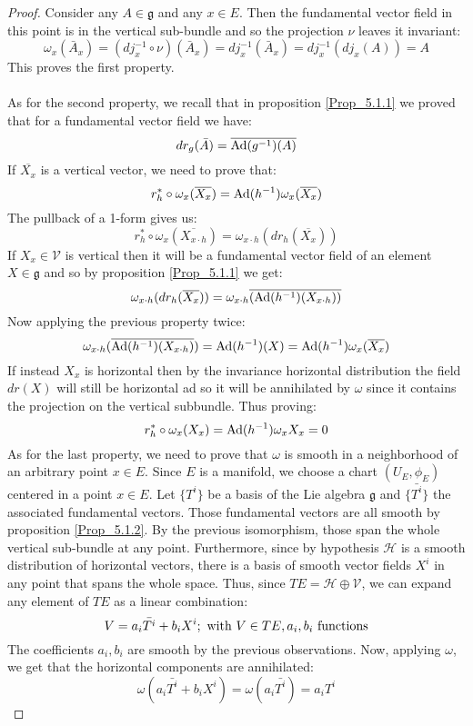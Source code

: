 \documentclass[12pt,a4paper]{report}
\theoremstyle{definition}
\theoremstyle{Theorem}
\theoremstyle{definition}
\theoremstyle{definition}
\begin{document}
	\begin{proof}
		Consider any $A\in\mathfrak{g}$ and any $x\in E$. Then the fundamental vector field in this point is in the vertical sub-bundle and so the projection $\nu$ leaves it invariant:
		$$\omega_{x}(\bar{A}_{x})=(dj_{x}^{-1}\circ \nu)(\bar{A}_{x})=dj_{x}^{-1}(\bar{A}_{x})=
		dj_{x}^{-1}(dj_{x}(A))=A$$
		This proves the first property.\\
		\\
		As for the second property, we recall that in proposition \ref{Prop_5.1.1} we proved that for a fundamental vector field  we have:
		$$dr_g(\bar{A})=\overline{\hbox{Ad}(g^{-1})(A)}$$
		If $\overline{X_x}$ is a vertical vector, we need to prove that:
		$$r^*_h\circ \omega_{x}(\overline{X_{x}})=\hbox{Ad}(h^{-1})\omega_{x}(\overline{X_{x}})$$
		The pullback of a 1-form gives us:
		$$r^*_h\circ \omega_{x}(\overline{X_{x\cdot h}})=\omega_{x\cdot h}(dr_h(\overline{X_{x}}))$$
		If $X_{x}\in\mathcal{V}$ is vertical then it will be a fundamental vector field of an element $X\in\mathfrak{g}$ and so by proposition \ref{Prop_5.1.1} we get:
		$$\omega_{x\cdot h}(dr_h(\overline{X_{x}}))=\omega_{x\cdot h}\overline{(\hbox{Ad}(h^{-1})(X_{x\cdot h}))}$$
		Now applying the previous property twice:
		$$\omega_{x\cdot h}(\overline{\hbox{Ad}(h^{-1})(X_{x\cdot h})})=\hbox{Ad}(h^{-1})(X)=\hbox{Ad}(h^{-1})\omega_{x}(\overline{X_{x}})$$
		If instead $X_{x}$ is horizontal then by the invariance horizontal distribution the field $dr(X)$ will still be horizontal ad so it will be annihilated by $\omega$ since it contains the projection on the vertical subbundle. Thus proving:
		$$r^*_h\circ \omega_{x}(X_{x})=\hbox{Ad}(h^{-1})\omega_{x}X_{x}=0$$
		As for the last property, we need to prove that $\omega$ is smooth in a neighborhood of an arbitrary point $x\in E$. Since $E$ is a manifold, we choose a chart $(U_E,\phi_E)$ centered in a point $x\in E$. Let $\{T^i\}$ be a basis of the Lie algebra $\mathfrak{g}$ and $\{\bar{T^i}\}$ the associated fundamental vectors. Those fundamental vectors are all smooth by proposition \ref{Prop_5.1.2}. By the previous isomorphism, those span the whole vertical sub-bundle at any point. Furthermore, since by hypothesis $\mathcal{H}$ is a smooth distribution of horizontal vectors, there is a basis of smooth vector fields $X^i$ in any point that spans the whole space. Thus, since $TE=\mathcal{H}\oplus\mathcal{V}$, we can expand any element of $TE$ as a linear combination:
		$$V=a_i \bar{T^i}+b_iX^i;\hbox{ with } V\in TE, a_i,b_i \hbox{ functions}$$
		The coefficients $a_i,b_i$ are smooth by the previous observations. Now, applying $\omega$, we get that the horizontal components are annihilated:
		$$\omega(a_i \bar{T^i}+b_iX^i)=\omega(a_i \bar{T^i})=a_i T^i$$
	\end{proof}
\end{document}
